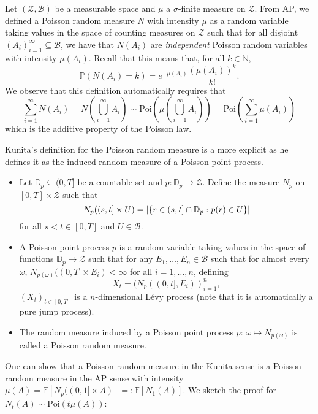 \documentclass[]{article}
\theoremstyle{definition}
\theoremstyle{definition}
\begin{document}
Let \((\mathcal{Z}, \mathcal{B})\) be a measurable space and \(\mu\) a \(\sigma\)-finite measure on \(\mathcal{Z}\).
From AP, we defined a Poisson random measure \(N\) with intensity \(\mu\) as a random variable taking values in the space of 
counting measures on \(\mathcal{Z}\) such that for all disjoint \((A_i)_{i = 1}^\infty \subseteq \mathcal{B}\), 
we have that \(N(A_i)\) are \textit{independent} Poisson random variables with intensity \(\mu(A_i)\). 
Recall that this means that, for all \(k \in \mathbb{N}\),
\[\mathbb{P}(N(A_i) = k) = e^{-\mu(A_i)} \frac{(\mu(A_i))^k}{k!}.\]
We observe that this definition automatically requires that
\[\sum_{i = 1}^\infty N(A_i) = N\left(\bigcup_{i = 1}^\infty A_i\right) \sim 
  \text{Poi}\left(\mu\left(\bigcup_{i = 1}^\infty A_i\right)\right) = 
  \text{Poi}\left(\sum_{i = 1}^\infty \mu(A_i)\right)\]
which is the additive property of the Poisson law.

Kunita's definition for the Poisson random measure is a more explicit as he defines it as the induced random 
measure of a Poisson point process. 
\begin{itemize}
  \item Let \(\mathbb{D}_p \subseteq (0, T]\) be a countable set and \(p : \mathbb{D}_p \to \mathcal{Z}\).
    Define the measure \(N_p\) on \([0, T] \times \mathcal{Z}\) such that  
    \[N_p((s, t] \times U) = \abs{\{r \in (s, t] \cap \mathbb{D}_p : p(r) \in U\}}\]
    for all \(s < t \in [0, T]\) and \(U \in \mathcal{B}\).
  \item A Poisson point process \(p\) is a random variable taking values in the space of functions 
    \(\mathbb{D}_p \to \mathcal{Z}\) such that for any \(E_1, \dots, E_n \in \mathcal{B}\) such that 
    for almost every \(\omega\), \(N_{p(\omega)}((0, T] \times E_i) < \infty\) for all \(i = 1, \dots, n\), 
    defining 
    \[X_t = (N_p((0, t], E_i))_{i = 1}^n,\]
    \((X_t)_{t \in [0, T]}\) is a \(n\)-dimensional L\'evy process (note that it is automatically a pure jump process).
  \item The random measure induced by a Poisson point process \(p\): \(\omega \mapsto N_{p(\omega)}\) 
    is called a Poisson random measure.
\end{itemize}

One can show that a Poisson random measure in the Kunita sense is a Poisson random measure in the AP sense 
with intensity \(\mu(A) = \mathbb{E}[N_p((0, 1] \times A)] =: \mathbb{E}[N_1(A)]\). We sketch the proof 
for \(N_t(A) \sim \text{Poi}(t\mu(A))\):
\end{document}
